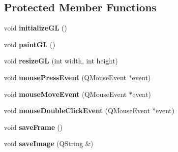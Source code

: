 \subsection*{Protected Member Functions}
\begin{DoxyCompactItemize}
\item 
\hypertarget{class_g_l_widget_a7fab13e8cc9fc0730ca54c08b2c923a7}{void {\bfseries initialize\-G\-L} ()}\label{class_g_l_widget_a7fab13e8cc9fc0730ca54c08b2c923a7}

\item 
\hypertarget{class_g_l_widget_a640b5570cb2b37724fd5b58a77339c5e}{void {\bfseries paint\-G\-L} ()}\label{class_g_l_widget_a640b5570cb2b37724fd5b58a77339c5e}

\item 
\hypertarget{class_g_l_widget_ac0d2a8ecf60907a81c0d73475d851025}{void {\bfseries resize\-G\-L} (int width, int height)}\label{class_g_l_widget_ac0d2a8ecf60907a81c0d73475d851025}

\item 
\hypertarget{class_g_l_widget_ab144cc8064c1bbf6d0ef0646ca0bd06c}{void {\bfseries mouse\-Press\-Event} (Q\-Mouse\-Event $\ast$event)}\label{class_g_l_widget_ab144cc8064c1bbf6d0ef0646ca0bd06c}

\item 
\hypertarget{class_g_l_widget_a9043bac13d6f0a5307ea5c7f9b3caa50}{void {\bfseries mouse\-Move\-Event} (Q\-Mouse\-Event $\ast$event)}\label{class_g_l_widget_a9043bac13d6f0a5307ea5c7f9b3caa50}

\item 
\hypertarget{class_g_l_widget_a0495fe7afc77e7782111f5816405abc0}{void {\bfseries mouse\-Double\-Click\-Event} (Q\-Mouse\-Event $\ast$event)}\label{class_g_l_widget_a0495fe7afc77e7782111f5816405abc0}

\item 
\hypertarget{class_g_l_widget_a3fc170fb9be74bc3e771b6356bf981b2}{void {\bfseries save\-Frame} ()}\label{class_g_l_widget_a3fc170fb9be74bc3e771b6356bf981b2}

\item 
\hypertarget{class_g_l_widget_a068f6ece9170b92f3b54741b3ff8df9f}{void {\bfseries save\-Image} (Q\-String \&)}\label{class_g_l_widget_a068f6ece9170b92f3b54741b3ff8df9f}

\end{DoxyCompactItemize}
